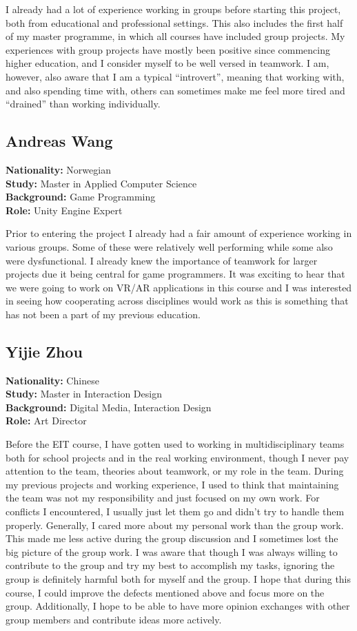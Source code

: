 I already had a lot of experience working in groups before starting this project, both from educational and professional settings. This also includes the first half of my master programme, in which all courses have included group projects. My experiences with group projects have mostly been positive since commencing higher education, and I consider myself to be well versed in teamwork. I am, however, also aware that I am a typical “introvert”, meaning that working with, and also spending time with, others can sometimes make me feel more tired and “drained” than working individually. 


\subsection{Andreas Wang}
\textbf{Nationality:} Norwegian \\
\textbf{Study:} Master in Applied Computer Science \\
\textbf{Background:} Game Programming \\ 
\textbf{Role:} Unity Engine Expert

Prior to entering the project I already had a fair amount of experience working in various groups. Some of these were relatively well performing while some also were dysfunctional. I already knew the importance of teamwork for larger projects due it being central for game programmers. It was exciting to hear that we were going to work on VR/AR applications in this course and I was interested in seeing how cooperating across disciplines would work as this is something that has not been a part of my previous education. 

\subsection{Yijie Zhou}
\textbf{Nationality:} Chinese \\
\textbf{Study:} Master in Interaction Design \\
\textbf{Background:} Digital Media, Interaction Design \\
\textbf{Role:} Art Director

Before the EIT course, I have gotten used to working in multidisciplinary teams both for school projects and in the real working environment, though I never pay attention to the team, theories about teamwork, or my role in the team. During my previous projects and working experience, I used to think that maintaining the team was not my responsibility and just focused on my own work. For conflicts I encountered, I usually just let them go and didn’t try to handle them properly. Generally, I cared more about my personal work than the group work. This made me less active during the group discussion and I sometimes lost the big picture of the group work. I was aware that though I was always willing to contribute to the group and try my best to accomplish my tasks, ignoring the group is definitely harmful both for myself and the group. I hope that during this course, I could improve the defects mentioned above and focus more on the group. Additionally, I hope to be able to have more opinion exchanges with other group members and contribute ideas more actively. 
 